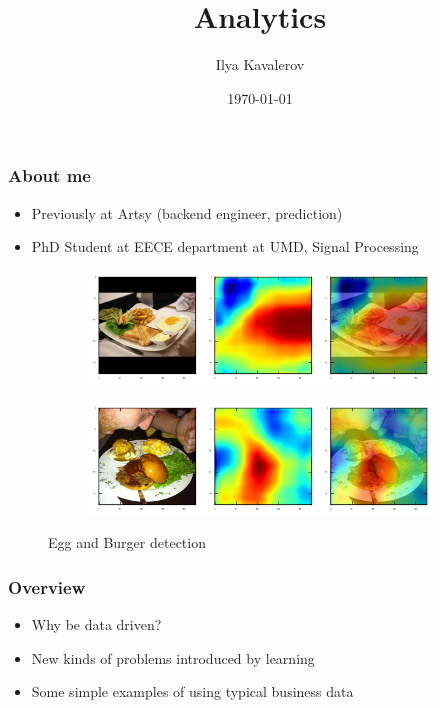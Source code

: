 \documentclass{beamer}
\title[Cornell CS5356 Fall 2015]{Analytics} %
\author{Ilya Kavalerov} %
\institute[UMD] %
{
University of Maryland \\ %
Electrical and Computer Engineering \\
\medskip
\textit{ilyak@umiacs.umd.edu} %
}
\date{\today} %
\begin{document}
\begin{frame}
\titlepage %
\end{frame}


\begin{frame}
	\frametitle{About me}
	\begin{itemize}
		\item Previously at Artsy (backend engineer, prediction)
		\item PhD Student at EECE department at UMD, Signal Processing
	\end{itemize}
	
	\begin{figure}
		\centering
		\begin{subfigure}{.5\textwidth}
			\centering
			\includegraphics[width=1\linewidth]{3897517_class28_overlaid_heatmap}
		\end{subfigure}%
		\begin{subfigure}{.5\textwidth}
			\centering
			\includegraphics[width=1\linewidth]{925105_class80_overlaid_heatmap}
		\end{subfigure}
		\caption{Egg and Burger detection}
	\end{figure}
	
\end{frame}


\begin{frame}
	\frametitle{Overview}
	\begin{itemize}
		\item Why be data driven?
		\item New kinds of problems introduced by learning
		\item Some simple examples of using typical business data
	\end{itemize}
\end{frame}
\end{document}
